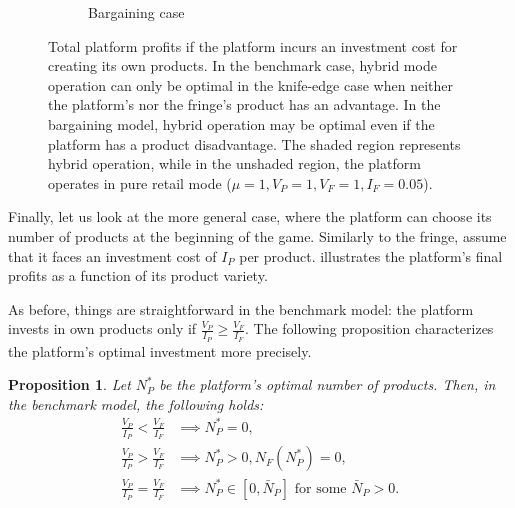 \documentclass[a4paper]{article}
\newtheorem{proposition}{Proposition}
\begin{document}
\begin{figure}
\begin{subfigure}[b]{0.45\textwidth}
        \caption{Bargaining case}
        \label{fig:optimal_n_p_bargaining}
    \end{subfigure}
    \caption{Total platform profits if the platform incurs an investment cost for creating its own products. In the benchmark case, hybrid mode operation can only be optimal in the knife-edge case when neither the platform's nor the fringe's product has an advantage. In the bargaining model, hybrid operation may be optimal even if the platform has a product disadvantage. The shaded region represents hybrid operation, while in the unshaded region, the platform operates in pure retail mode ($\mu = 1, V_P = 1, V_F = 1, I_F = 0.05$).}
    \label{fig:optimal_n_p}
\end{figure}


Finally, let us look at the more general case, where the platform can choose its number of products at the beginning of the game.
Similarly to the fringe, assume that it faces an investment cost of $I_P$ per product.
 illustrates the platform's final profits as a function of its product variety.

As before, things are straightforward in the benchmark model: the platform invests in own products only if $\frac{V_P}{I_P} \geq \frac{V_F}{I_F}$.
The following proposition characterizes the platform's optimal investment more precisely.
\begin{proposition}
    \label{prop:optimal_n_p_benchmark}
    Let $N_P^*$ be the platform's optimal number of products.
    Then, in the benchmark model, the following holds:
    \begin{align*}
        \frac{V_P}{I_P} < \frac{V_F}{I_F} &\implies N_P^* = 0, \\
        \frac{V_P}{I_P} > \frac{V_F}{I_F} &\implies N_P^* > 0, N_F(N_P^*) = 0, \\
        \frac{V_P}{I_P} = \frac{V_F}{I_F} &\implies N_P^* \in [0, \bar{N}_P] \text{ for some } \bar{N}_P > 0.
    \end{align*}
\end{proposition}
\end{document}
